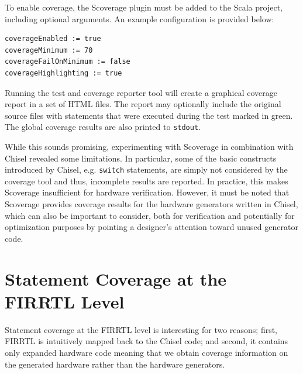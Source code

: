 \documentclass[conference]{IEEEtran}
\begin{document}
To enable coverage, the Scoverage plugin must be added to the Scala project, including optional arguments.
An example configuration is provided below:
\begin{verbatim}
coverageEnabled := true
coverageMinimum := 70
coverageFailOnMinimum := false
coverageHighlighting := true
\end{verbatim}
Running the test and coverage reporter tool will create a graphical coverage report in a set of HTML files. The report may optionally include the original source files with statements that were executed during the test marked in green. The global coverage results are also printed to \texttt{stdout}.

While this sounds promising, experimenting with Scoverage in combination with Chisel revealed some limitations. In particular, some of the basic constructs introduced by Chisel, e.g. \texttt{switch} statements, are simply not considered by the coverage tool and thus, incomplete results are reported. In practice, this makes Scoverage insufficient for hardware verification. However, it must be noted that Scoverage provides coverage results for the hardware generators written in Chisel, which can also be important to consider, both for verification and potentially for optimization purposes by pointing a designer's attention toward unused generator code.

\section{Statement Coverage at the FIRRTL Level}  
Statement coverage at the FIRRTL level is interesting for two reasons; first, FIRRTL is intuitively mapped back to the Chisel code; and second, it contains only expanded hardware code meaning that we obtain coverage information on the generated hardware rather than the hardware generators.%
\end{document}
